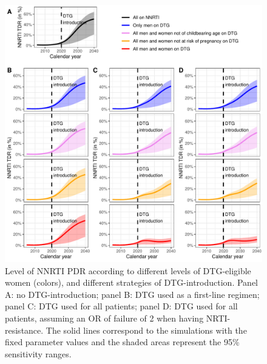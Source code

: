 \documentclass{article}
\begin{document}
\begin{figure}[h!]
\centering
   \includegraphics[width=16cm]{../figures/sens_uncertainty.pdf}
   \caption{Level of NNRTI PDR according to different levels of DTG-eligible women (colors), and different strategies of DTG-introduction. Panel A: no DTG-introduction; panel B: DTG used as a first-line regimen; panel C: DTG used for all patients; panel D: DTG used for all patients, assuming an OR of failure of 2 when having NRTI-resistance. The solid lines correspond to the simulations with the fixed parameter values and the shaded areas represent the 95\% sensitivity ranges.}\label{fig:sensitivity_range}
\end{figure}
\end{document}
